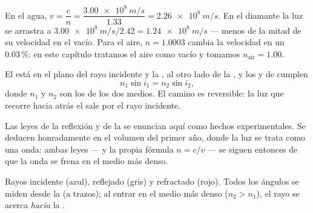 \begin{example}\label{ex:g10:refraction:speed}
En el agua, $v = \dfrac{c}{n} = \dfrac{\qty{3.00e8}{m/s}}{1.33}
= \qty{2.26e8}{m/s}$. En el diamante la luz se arrastra a
$\qty{3.00e8}{m/s}/2.42 = \qty{1.24e8}{m/s}$ --- menos de la mitad de su
velocidad en el vacío. Para el aire, $n = 1.0003$ cambia la velocidad en
un $0.03\,\%$: en este capítulo tratamos el aire como vacío y tomamos
$n_{\text{air}} = 1.00$.
\end{example}

\begin{theorem}\label{thm:g10:refraction:snell}
El  está en el plano del rayo incidente y la , al
otro lado de la , y los  y de 
cumplen
\[
n_1 \sin i_1 = n_2 \sin i_2 ,
\]
donde $n_1$ y $n_2$ son los  de los dos medios. El
camino es reversible: la luz que recorre hacia atrás el 
sale por el rayo incidente.
\end{theorem}
\admitted

\begin{remark}\label{rem:g10:refraction:honest}
Las leyes de la reflexión y de la  se enuncian aquí como
hechos experimentales. Se deducen honradamente en el volumen del primer
año, donde la luz se trata como una onda: ambas leyes --- y la propia
fórmula $n = c/v$ --- se siguen entonces de que la onda se frena en el
medio más denso.
\end{remark}

\begin{omfigure}

{\small Rayos incidente (azul), reflejado (gris) y refractado (rojo).
Todos los ángulos se miden desde la  (a trazos); al entrar en el
medio más denso ($n_2 > n_1$), el rayo se acerca \emph{hacia} la
.}
\end{omfigure}

